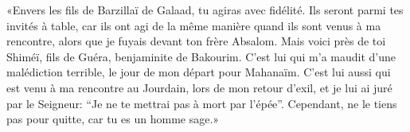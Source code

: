 «Envers les fils de Barzillaï de Galaad, tu agiras avec fidélité.
Ils seront parmi tes invités à table,
	car ils ont agi de la même manière quand ils sont venus à ma rencontre,
	alors que je fuyais devant ton frère Absalom.
Mais voici près de toi Shiméï, fils de Guéra, benjaminite de Bakourim.
	C’est lui qui m’a maudit d’une malédiction terrible,
	le jour de mon départ pour Mahanaïm.
C’est lui aussi qui est venu à ma rencontre au Jourdain, lors de mon retour d’exil,
	et je lui ai juré par le Seigneur:
	“Je ne te mettrai pas à mort par l’épée”.
Cependant, ne le tiens pas pour quitte, car tu es un homme sage.»
